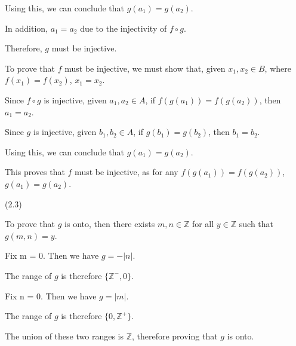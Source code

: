 \documentclass{exam}
\begin{document}
\begin{questions}
\begin{subparts}
\begin{center}
Using this, we can conclude that \(g(a_1) = g(a_2)\).

In addition, \(a_1 = a_2\) due to the injectivity of \(f \circ g\).

Therefore, \(g\) must be injective.

\end{center}
\vspace{5px}


\begin{center}

To prove that \(f\) must be injective, we must show that, given \(x_1, x_2 \in B\), where \(f(x_1) = f(x_2)\), \(x_1 = x_2\).

Since \(f \circ g\) is injective, given \(a_1, a_2 \in A\), if \(f(g(a_1)) = f(g(a_2))\), then \(a_1 = a_2\).

Since \(g\) is injective, given \(b_1, b_2 \in A\), if \(g(b_1) = g(b_2)\), then \(b_1 = b_2\).

Using this, we can conclude that \(g(a_1) = g(a_2)\).

This proves that \(f\) must be injective, as for any \(f(g(a_1)) = f(g(a_2))\), \(g(a_1) = g(a_2)\).

\end{center}

\end{subparts}

 (2.3)

\begin{center}

To prove that \(g\) is onto, then there exists \(m, n \in \mathbb{Z}\) for all \(y \in \mathbb{Z}\) such that \(g(m,n) = y\).

Fix m = 0. Then we have \(g = -|n|\).

The range of \(g\) is therefore \(\{\mathbb{Z^-}, 0\} \).

Fix n = 0. Then we have \(g = |m|\).

The range of \(g\) is therefore \(\{0, \mathbb{Z^+}\} \).

The union of these two ranges is \(\mathbb{Z}\), therefore proving that \(g\) is onto.

\end{center}


\end{questions}
\end{document}

